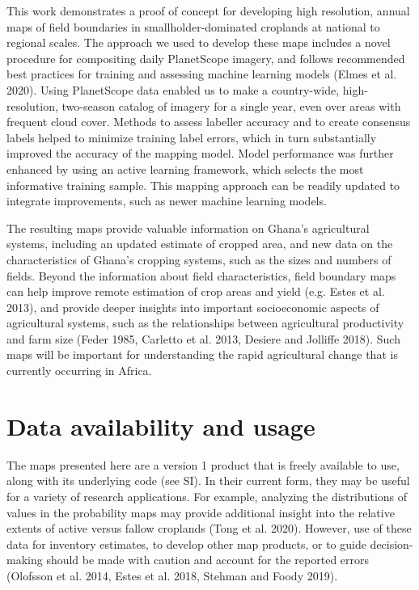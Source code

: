 \documentclass[11pt,a4paper]{article}
\begin{document}
This work demonstrates a proof of concept for developing high
resolution, annual maps of field boundaries in smallholder-dominated
croplands at national to regional scales. The approach we used to
develop these maps includes a novel procedure for compositing daily
PlanetScope imagery, and follows recommended best practices for training
and assessing machine learning models (Elmes et al. 2020). Using
PlanetScope data enabled us to make a country-wide, high-resolution,
two-season catalog of imagery for a single year, even over areas with
frequent cloud cover. Methods to assess labeller accuracy and to create
consensus labels helped to minimize training label errors, which in turn
substantially improved the accuracy of the mapping model. Model
performance was further enhanced by using an active learning framework,
which selects the most informative training sample. This mapping
approach can be readily updated to integrate improvements, such as newer
machine learning models.

The resulting maps provide valuable information on Ghana's agricultural
systems, including an updated estimate of cropped area, and new data on
the characteristics of Ghana's cropping systems, such as the sizes and
numbers of fields. Beyond the information about field characteristics,
field boundary maps can help improve remote estimation of crop areas and
yield (e.g. Estes et al. 2013), and provide deeper insights into
important socioeconomic aspects of agricultural systems, such as the
relationships between agricultural productivity and farm size (Feder
1985, Carletto et al. 2013, Desiere and Jolliffe 2018). Such maps will
be important for understanding the rapid agricultural change that is
currently occurring in Africa.

\hypertarget{data-availability-and-usage}{%
\section{Data availability and
usage}\label{data-availability-and-usage}}

The maps presented here are a version 1 product that is freely available
to use, along with its underlying code (see SI). In their current form,
they may be useful for a variety of research applications. For example,
analyzing the distributions of values in the probability maps may
provide additional insight into the relative extents of active versus
fallow croplands (Tong et al. 2020). However, use of these data for
inventory estimates, to develop other map products, or to guide
decision-making should be made with caution and account for the reported
errors (Olofsson et al. 2014, Estes et al. 2018, Stehman and Foody
2019).
\end{document}
